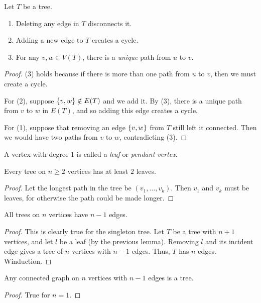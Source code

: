 \begin{proposition}
    Let $T$ be a tree.
    \begin{enumerate}[label=(\arabic*)]
        \item Deleting any edge in $T$ disconnects it.
        \item Adding a new edge to $T$ creates a cycle.
        \item For any $v, w \in V(T)$, there is a \emph{unique} path from
        $u$ to $v$.
    \end{enumerate}
\end{proposition}
\begin{proof}
    (3) holds because if there is more than one path from $u$ to $v$,
    then we must create a cycle.

    For (2), suppose $\set{v, w} \notin E(T)$ and we add it.
    By (3), there is a unique path from $v$ to $w$ in $E(T)$, and so adding
    this edge creates a cycle.

    For (1), suppose that removing an edge $\set{v, w}$ from $T$ still left
    it connected.
    Then we would have two paths from $v$ to $w$, contradicting (3).
\end{proof}

\begin{definition}
    A vertex with degree $1$ is called a \emph{leaf} or
    \emph{pendant vertex}.
\end{definition}

\begin{lemma}
    Every tree on $n \ge 2$ vertices has at least $2$ leaves.
\end{lemma}
\begin{proof}
    Let the longest path in the tree be $(v_1, \dots, v_k)$.
    Then $v_1$ and $v_k$ must be leaves, for otherwise the path could be
    made longer.
\end{proof}

\begin{theorem}
    All trees on $n$ vertices have $n-1$ edges.
\end{theorem}
\begin{proof}
    This is clearly true for the singleton tree.
    Let $T$ be a tree with $n+1$ vertices, and let $l$ be a leaf (by the
    previous lemma).
    Removing $l$ and its incident edge gives a tree of $n$ vertices
    with $n-1$ edges.
    Thus, $T$ has $n$ edges.
    Winduction.
\end{proof}

\begin{theorem}
    Any connected graph on $n$ vertices with $n-1$ edges is a tree.
\end{theorem}
\begin{proof}
    True for $n=1$.
\end{proof}

